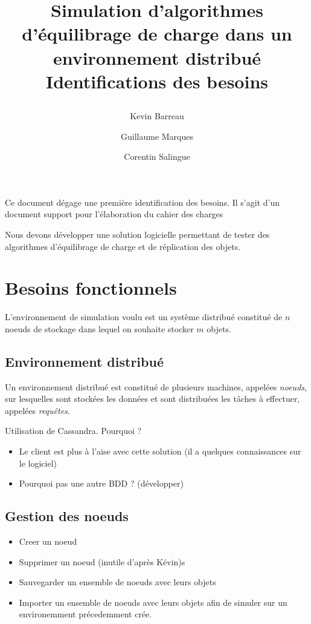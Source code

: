 \documentclass[12pt]{article}
\title{
 \begin{minipage}\linewidth
        \centering
        Simulation d'algorithmes d'équilibrage de charge dans un environnement distribué 
        \vskip3pt
        \large Identifications des besoins
    \end{minipage}
 }
\author{Kevin Barreau \and Guillaume Marques \and Corentin Salingue}
\begin{document}
\maketitle

\abstract
Ce document dégage une première identification des besoins.
Il s'agit d'un document support pour l'élaboration du cahier des charges

\newpage

Nous devons développer une solution logicielle permettant de tester des algorithmes d'équilibrage de charge et de réplication des objets.

\section{Besoins fonctionnels}

L'environnement de simulation voulu est un système distribué constitué de $n$ noeuds de stockage dans lequel on souhaite stocker $m$ objets.

\subsection{Environnement distribué}

Un environnement distribué est constitué de plusieurs machines, appelées \textit{noeuds}, sur lesquelles sont stockées les données et sont distribuées les tâches à effectuer, appelées \textit{requêtes}.
	
\vspace{0.5cm}
Utilisation de Cassandra. Pourquoi ? \newline
\begin{itemize}
 \item Le client est plus à l'aise avec cette solution (il a quelques connaissances sur le logiciel)
 \item Pourquoi pas une autre BDD ? (développer)
\end{itemize}



\subsection{Gestion des noeuds}


\begin{itemize}
 \item Creer un noeud
 \item Supprimer un noeud (inutile d'après Kévin)s
 \item Sauvegarder un ensemble de noeuds avec leurs objets
 \item Importer un ensemble de noeuds avec leurs objets afin de simuler sur un environemment précedemment crée.
\end{itemize}
\end{document}
